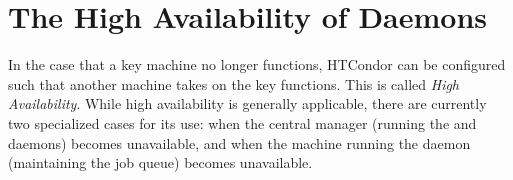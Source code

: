 \section{The High Availability of Daemons}\label{sec:high-availability} 


In the case that a key machine no longer functions,
HTCondor can be configured such that another machine takes on
the key functions.
This is called \emph{High Availability}.
While high availability is generally applicable,
there are currently two specialized cases for its use:
when the central manager 
(running the  and  daemons)
becomes unavailable,
and when the machine running the 
daemon (maintaining the job queue) becomes unavailable.





